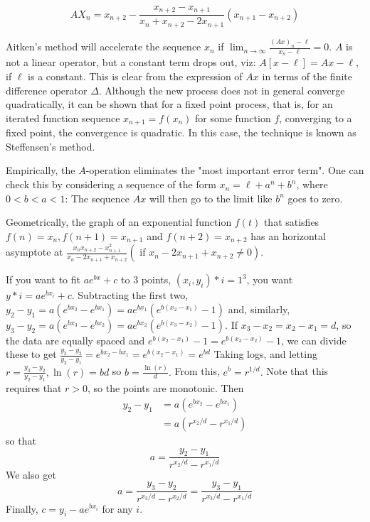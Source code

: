 $$
AX_n = x_{n+2} - \frac{x_{n+2} - x_{n+1} }{x_n + x_{n+2} - 2 x_{n+1} }(x_{n+1}-x_{n+2})
$$

Aitken's method will accelerate the sequence $x_{n}$ if $\lim_{n \rightarrow \infty} \frac{(A x)_{n}-\ell}{x_{n}-\ell}=0$.
$A$ is not a linear operator, but a constant term drops out, viz: $A[x-\ell]=A x-\ell$, if $\ell$ is a constant. This is clear from the expression of $A x$ in terms of the finite difference operator $\Delta$.
Although the new process does not in general converge quadratically, it can be shown that for a fixed point process, that is, for an iterated function sequence $x_{n+1}=f\left(x_{n}\right)$ for some function $f$, converging to a fixed point, the convergence is quadratic. In this case, the technique is known as Steffensen's method.

Empirically, the $A$-operation eliminates the "most important error term". One can check this by considering a sequence of the form $x_{n}=\ell+a^{n}+b^{n}$, where $0<b<a<1$: The sequence $A x$ will then go to the limit like $b^{n}$ goes to zero.

Geometrically, the graph of an exponential function $f(t)$ that satisfies \(f(n)=x_{n}, f(n+1)=x_{n+1}\) and \(f(n+2)=x_{n+2}\) has an horizontal asymptote at \(\frac{x_{n} x_{n+2}-x_{n+1}^{2}}{x_{n}-2 x_{n+1}+x_{n+2}}\left(\right.\) if \(\left.x_{n}-2 x_{n+1}+x_{n+2} \neq 0\right)\).

If you want to fit \(a e^{b x}+c\) to 3 points, \(\left(x_{i}, y_{i}\right)*{i=1}^{3}\), you want \(y*{i}=a e^{b x_{i}}+c .\)
Subtracting the first two, \(y_{2}-y_{1}=a\left(e^{b x_{2}}-e^{b x_{1}}\right)=a e^{b x_{1}}\left(e^{b\left(x_{2}-x_{1}\right)}-1\right)\) and, similarly, \(y_{3}-y_{2}=a\left(e^{b x_{3}}-e^{b x_{2}}\right)=a e^{b x_{2}}\left(e^{b\left(x_{3}-x_{2}\right)}-1\right) .\)
If \(x_{3}-x_{2}=x_{2}-x_{1}=d\), so the data are equally spaced and \(e^{b\left(x_{2}-x_{1}\right)}-1=e^{b\left(x_{3}-x_{2}\right)}-1\), we can divide these to get
\(\frac{y_{3}-y_{2}}{y_{2}-y_{1}}=e^{b x_{2}-b x_{1}}=e^{b\left(x_{2}-x_{1}\right)}=e^{b d}\)
Taking logs, and letting \(r=\frac{y_{3}-y_{2}}{y_{2}-y_{1}}, \ln (r)=b d\) so \(b=\frac{\ln (r)}{d} .\) From this, \(e^{b}=r^{1 / d} .\)
Note that this requires that \(r>0\), so the points are monotonic.
Then
\[
\begin{aligned}
y_{2}-y_{1} &=a\left(e^{b x_{2}}-e^{b x_{1}}\right) \\
&=a\left(r^{x_{2} / d}-r^{x_{1} / d}\right)
\end{aligned}
\]
so that
\[
a=\frac{y_{2}-y_{1}}{r^{x_{2} / d}-r^{x_{1} / d}}
\]
We also get
\[
a=\frac{y_{3}-y_{2}}{r^{x_{3} / d}-r^{x_{2} / d}}=\frac{y_{3}-y_{1}}{r^{x_{3} / d}-r^{x_{1} / d}}
\]
Finally, \(c=y_{i}-a e^{b x_{i}}\) for any \(i\).

